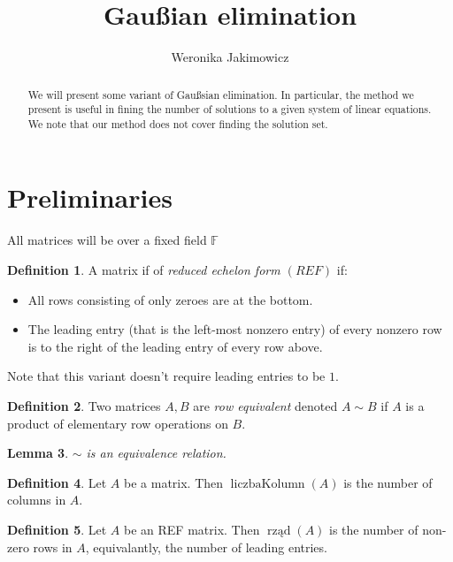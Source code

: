 \documentclass{article}
\title{Gaußian elimination}
\author{Weronika Jakimowicz}
\def\rr{rank}
\def\cCtn{colCount}
\DeclareMathOperator{\rank}{\rr}
\DeclareMathOperator{\colctn}{\cCtn}
\def\lemat{Lemma}
\newtheorem{lemma}{\lemat}[subsection]
\theoremstyle{definition}
\newtheorem{deff}[lemma]{Definition}
\def\lemat{Lemacik}
\def\rr{rząd}
\def\cCtn{liczbaKolumn}
\begin{document}
\maketitle

\begin{abstract}
We will present some variant of Gaußsian elimination. In particular, the method we present is useful in fining the number of solutions to a given system of linear equations. We note that our method does not cover finding the solution set.
\end{abstract}

\setcounter{section}{-1}

\section{Preliminaries}
All matrices will be over a fixed field $\mathbb{F}$

\begin{deff}
A matrix if of \emph{reduced echelon form $(REF)$} if:
\begin{itemize}
\item All rows consisting of only zeroes are at the bottom.
\item The leading entry (that is the left-most nonzero entry) of every nonzero row is to the right of the leading entry of every row above.
\end{itemize}
\end{deff}

Note that this variant doesn't require leading entries to be $1$.

\begin{deff}
Two matrices $A,B$ are \emph{row equivalent} denoted $A\sim B$ if $A$ is a product of elementary row operations on $B$.
\end{deff}

\begin{lemma}
$\sim$ is an equivalence relation.
\end{lemma}

\begin{deff}
Let $A$ be a matrix. Then $\colctn(A)$ is the number of columns in $A$.
\end{deff}

\begin{deff}
Let $A$ be an REF matrix. Then $\rank(A)$ is the number of non-zero rows in $A$, equivalantly, the number of leading entries.
\end{deff}
\end{document}

